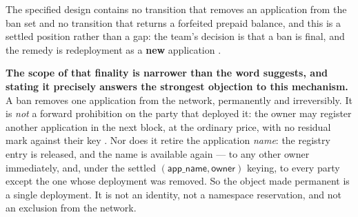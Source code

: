 \begin{property}
\label{op:23:reinstatement}
The specified design contains no transition that removes an application from the ban set and no
transition that returns a forfeited prepaid balance, and this is a settled position rather than a
gap: the team's decision is that a ban is final, and the remedy is redeployment as a \textbf{new}
application .

\textbf{The scope of that finality is narrower than the word suggests, and stating it precisely
answers the strongest objection to this mechanism.} A ban removes one application from the network,
permanently and irreversibly. It is \emph{not} a forward prohibition on the party that deployed it:
the owner may register another application in the next block, at the ordinary price, with no
residual mark against their key . Nor does it retire the application
\emph{name}: the registry entry is released, and the name is available again --- to any other owner
immediately, and, under the settled $(\mathsf{app\_name}, \mathsf{owner})$ keying, to every party
except the one whose deployment was removed. So the object made permanent is a single deployment. It
is not an identity, not a namespace reservation, and not an exclusion from the network.


\end{property}
